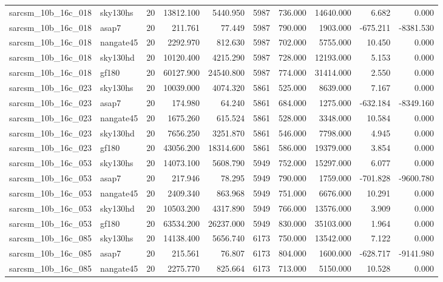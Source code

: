\begin{longtable}{llrrrrrrrr}
sarcsm\_10b\_16c\_018 & sky130hs & 20 & 13812.100 & 5440.950 & 5987 & 736.000 & 14640.000 & 6.682 & 0.000 \\
sarcsm\_10b\_16c\_018 & asap7 & 20 & 211.761 & 77.449 & 5987 & 790.000 & 1903.000 & -675.211 & -8381.530 \\
sarcsm\_10b\_16c\_018 & nangate45 & 20 & 2292.970 & 812.630 & 5987 & 702.000 & 5755.000 & 10.450 & 0.000 \\
sarcsm\_10b\_16c\_018 & sky130hd & 20 & 10120.400 & 4215.290 & 5987 & 728.000 & 12193.000 & 5.153 & 0.000 \\
sarcsm\_10b\_16c\_018 & gf180 & 20 & 60127.900 & 24540.800 & 5987 & 774.000 & 31414.000 & 2.550 & 0.000 \\
sarcsm\_10b\_16c\_023 & sky130hs & 20 & 10039.000 & 4074.320 & 5861 & 525.000 & 8639.000 & 7.167 & 0.000 \\
sarcsm\_10b\_16c\_023 & asap7 & 20 & 174.980 & 64.240 & 5861 & 684.000 & 1275.000 & -632.184 & -8349.160 \\
sarcsm\_10b\_16c\_023 & nangate45 & 20 & 1675.260 & 615.524 & 5861 & 528.000 & 3348.000 & 10.584 & 0.000 \\
sarcsm\_10b\_16c\_023 & sky130hd & 20 & 7656.250 & 3251.870 & 5861 & 546.000 & 7798.000 & 4.945 & 0.000 \\
sarcsm\_10b\_16c\_023 & gf180 & 20 & 43056.200 & 18314.600 & 5861 & 586.000 & 19379.000 & 3.854 & 0.000 \\
sarcsm\_10b\_16c\_053 & sky130hs & 20 & 14073.100 & 5608.790 & 5949 & 752.000 & 15297.000 & 6.077 & 0.000 \\
sarcsm\_10b\_16c\_053 & asap7 & 20 & 217.946 & 78.295 & 5949 & 790.000 & 1759.000 & -701.828 & -9600.780 \\
sarcsm\_10b\_16c\_053 & nangate45 & 20 & 2409.340 & 863.968 & 5949 & 751.000 & 6676.000 & 10.291 & 0.000 \\
sarcsm\_10b\_16c\_053 & sky130hd & 20 & 10503.200 & 4317.890 & 5949 & 766.000 & 13576.000 & 3.909 & 0.000 \\
sarcsm\_10b\_16c\_053 & gf180 & 20 & 63534.200 & 26237.000 & 5949 & 830.000 & 35103.000 & 1.964 & 0.000 \\
sarcsm\_10b\_16c\_085 & sky130hs & 20 & 14138.400 & 5656.740 & 6173 & 750.000 & 13542.000 & 7.122 & 0.000 \\
sarcsm\_10b\_16c\_085 & asap7 & 20 & 215.561 & 76.807 & 6173 & 804.000 & 1600.000 & -628.717 & -9141.980 \\
sarcsm\_10b\_16c\_085 & nangate45 & 20 & 2275.770 & 825.664 & 6173 & 713.000 & 5150.000 & 10.528 & 0.000 \\

\end{longtable}
